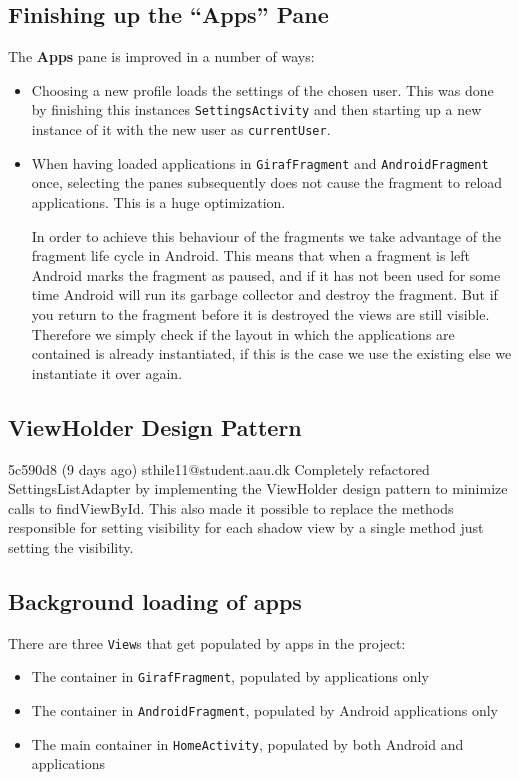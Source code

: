 \subsection{Finishing up the ``Apps'' Pane}

The \textbf{Apps} pane is improved in a number of ways:
\begin{itemize}
\item Choosing a new profile loads the settings of the chosen user.
This was done by finishing this instances \lstinline|SettingsActivity| and then starting up a new instance of it with the new user as \lstinline|currentUser|.
\item When having loaded applications in \lstinline|GirafFragment| and \lstinline|AndroidFragment| once, selecting the panes subsequently does not cause the fragment to reload applications. This is a huge optimization.

In order to achieve this behaviour of the fragments we take advantage of the fragment life cycle in Android. This means that when a fragment is left Android marks the fragment as paused, and if it has not been used for some time Android will run its garbage collector and destroy the fragment. But if you return to the fragment before it is destroyed the views are still visible. Therefore we simply check if the layout in which the applications are contained is already instantiated, if this is the case we use the existing else we instantiate it over again.

\end{itemize}

\subsection{ViewHolder Design Pattern}
5c590d8 (9 days ago) sthile11@student.aau.dk Completely refactored SettingsListAdapter by implementing the ViewHolder design pattern to minimize calls to findViewById. This also made it possible to replace the methods responsible for setting visibility for each shadow view by a single method just setting the visibility.

\subsection{Background loading of apps}\label{sec:sprint4:dev:loadapplicationtask}
There are three \lstinline!View!s that get populated by apps in the \launcher project:

\begin{itemize}
\item The container in \lstinline!GirafFragment!, populated by \giraf applications only
\item The container in \lstinline!AndroidFragment!, populated by Android applications only
\item The main container in \lstinline!HomeActivity!, populated by both Android and \giraf applications
\end{itemize}

